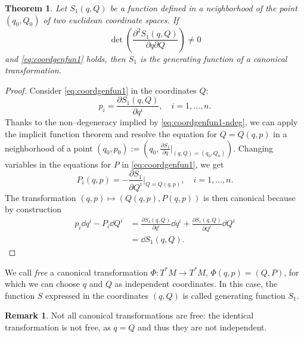 \documentclass[english,fontsize=11pt,paper=b5]{scrbook}
\newtheorem{theorem}{Theorem}[chapter]
\theoremstyle{definition}
\newtheorem{remark}{Remark}[chapter]
\begin{document}
    \begin{theorem}\label{thm:S1}
      Let $S_1(q,Q)$ be a function defined in a neighborhood of the point $(q_0, Q_0)$ of two euclidean coordinate spaces. If
      \begin{equation}\label{eq:coordgenfun1-ndeg}
        \det\left( \frac{\partial^2 S_1(q,Q)}{\partial q \partial Q} \right)\neq 0
      \end{equation}
      and \eqref{eq:coordgenfun1} holds, then $S_1$ is the generating function of a canonical transformation.
    \end{theorem}
    \begin{proof}
      Consider \eqref{eq:coordgenfun1} in the coordinates $Q$:
      \begin{equation}
        p_i = \frac{\partial S_1(q,Q)}{\partial q^i}, \quad i = 1,\ldots, n.
      \end{equation}
      Thanks to the non--degeneracy implied by \eqref{eq:coordgenfun1-ndeg}, we can apply the implicit function theorem and resolve the equation for $Q = Q(q,p)$ in a neighborhood of a point $(q_0, p_0) := \left(q_0, \frac{\partial S_1}{\partial q}\Big|_{(q,Q) =(q_0, Q_0)}\right)$.
      Changing variables in the equations for $P$ in \eqref{eq:coordgenfun1}, we get
      \begin{equation}
        P_i(q,p) = -\frac{\partial S_1}{\partial Q^i}\Big|_{Q=Q(q,p)},\quad i=1,\ldots,n.
      \end{equation}
      The transformation $(q,p) \mapsto (Q(q,p), P(q,p))$ is then canonical because by construction
      \begin{align}
        p_i \dd q^i - P_i \dd Q^i & = \frac{\partial S_1(q,Q)}{\partial q^i}\dd q^i + \frac{\partial S_1(q,Q)}{\partial Q^i}\dd Q^i \\
                                  & = \dd S_1(q,Q).
      \end{align}
    \end{proof}

    \begin{tcolorbox}
      We call \emph{free} a canonical transformation $\Phi:T^*M\to T^* M$, $\Phi(q,p) = (Q,P)$, for which we can choose $q$ and $Q$ as independent coordinates.
      In this case, the function $S$ expressed in the coordinates $(q,Q)$ is called generating function $S_1$.
    \end{tcolorbox}

    \begin{remark}
      Not all canonical transformations are free: the identical transformation is not free, as $q=Q$ and thus they are not independent.
    \end{remark}
\end{document}
